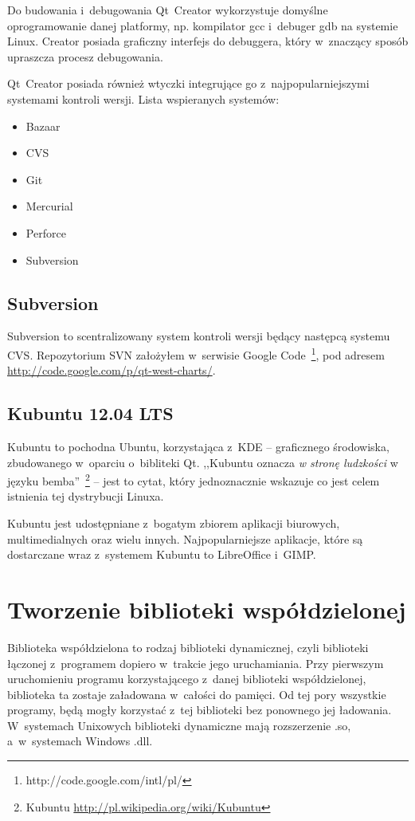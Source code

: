 Do budowania i~debugowania Qt~Creator wykorzystuje domyślne oprogramowanie danej platformy, np. kompilator gcc i~debuger gdb na systemie Linux. Creator posiada graficzny interfejs do debuggera, który w~znaczący sposób upraszcza procesz debugowania.

Qt~Creator posiada również wtyczki integrujące go z~najpopularniejszymi systemami kontroli wersji. Lista wspieranych systemów:
\begin{itemize}
\item{Bazaar}
\item{CVS}
\item{Git}
\item{Mercurial}
\item{Perforce}
\item{Subversion}
\end{itemize}

\subsection{Subversion}
Subversion to scentralizowany system kontroli wersji będący następcą systemu CVS. Repozytorium SVN założyłem w~serwisie Google Code~\footnote{http://code.google.com/intl/pl/}, pod adresem \url{http://code.google.com/p/qt-west-charts/}.

\subsection{Kubuntu 12.04 LTS}
Kubuntu to pochodna Ubuntu, korzystająca z~KDE -- graficznego środowiska, zbudowanego w~oparciu o~bibliteki Qt. ,,Kubuntu oznacza \textit{w stronę ludzkości} w języku bemba''~\footnote{Kubuntu \url{http://pl.wikipedia.org/wiki/Kubuntu}} -- jest to cytat, który jednoznacznie wskazuje co jest celem istnienia tej dystrybucji Linuxa.

Kubuntu jest udostępniane z~bogatym zbiorem aplikacji biurowych, multimedialnych oraz wielu innych. Najpopularniejsze aplikacje, które są dostarczane wraz z~systemem Kubuntu to LibreOffice i~GIMP. 

\section{Tworzenie biblioteki współdzielonej}
Biblioteka współdzielona to rodzaj biblioteki dynamicznej, czyli biblioteki łączonej z~programem dopiero w~trakcie jego uruchamiania. Przy pierwszym uruchomieniu programu korzystającego z~danej biblioteki współdzielonej, biblioteka ta zostaje załadowana w~całości do pamięci. Od tej pory wszystkie programy, będą mogły korzystać z~tej biblioteki bez ponownego jej ładowania. W~systemach Unixowych biblioteki dynamiczne mają rozszerzenie .so, a~w~systemach Windows .dll.

